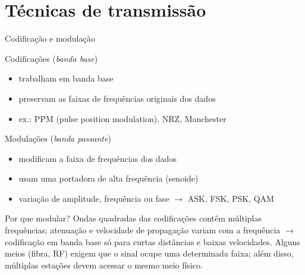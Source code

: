 \documentclass[aspectratio=169,11pt]{beamer}
\begin{document}
\section{Técnicas de transmissão}

\begin{frame}{Codificação e modulação}
  \begin{block}{Codificações (\emph{banda base})}
    \begin{itemize}
      \item trabalham em banda base
      \item preservam as faixas de frequências originais dos dados
      \item ex.: PPM (pulse position modulation), NRZ, Manchester
    \end{itemize}
  \end{block}
  \begin{block}{Modulações (\emph{banda passante})}
    \begin{itemize}
      \item modificam a faixa de frequências dos dados
      \item usam uma portadora de alta frequência (senoide)
      \item variação de amplitude, frequência ou fase $\rightarrow$ ASK, FSK, PSK, QAM
    \end{itemize}
  \end{block}
  \begin{alertblock}{Por que modular?}
    Ondas quadradas das codificações contêm múltiplas frequências; atenuação e velocidade de propagação variam com a frequência $\rightarrow$ codificação em banda base só para curtas distâncias e baixas velocidades. Alguns meios (fibra, RF) exigem que o sinal ocupe uma determinada faixa; além disso, múltiplas estações devem acessar o mesmo meio físico.
  \end{alertblock}
\end{frame}
\end{document}
